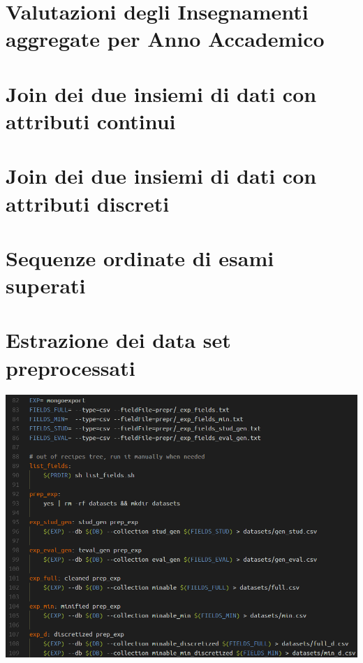 	

\section{Valutazioni degli Insegnamenti aggregate per Anno Accademico}

\section{Join dei due insiemi di dati con attributi continui}

\section{Join dei due insiemi di dati con attributi discreti}

\section{Sequenze ordinate di esami superati}

\section{Estrazione dei data set preprocessati}

	\begin{center}
		\includegraphics[scale=0.7]{img/export.png}
	\end{center}

	

